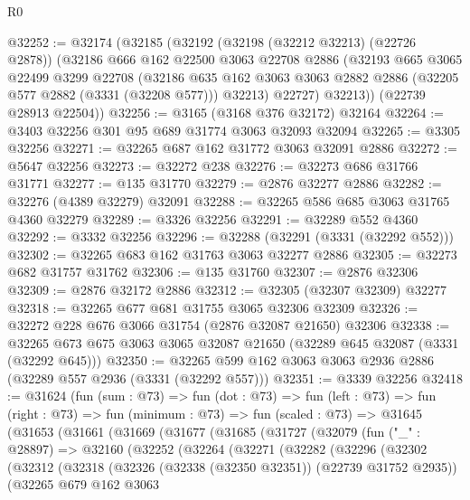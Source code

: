 \begin{lexlean}{R0}
\begin{coremodule}
@32252 := @32174
    (@32185
      (@32192
        (@32198 (@32212 @32213) (@22726 @2878))
        (@32186
          @666
          @162
          @22500
          @3063
          @22708
          @2886
          (@32193
            @665
            @3065
            @22499
            @3299
            @22708
            (@32186
              @635
              @162
              @3063
              @3063
              @2882
              @2886
              (@32205 @577 @2882 (@3331 (@32208 @577)))
              @32213)
            @22727)
          @32213))
      (@22739 @28913 @22504))
@32256 := @3165 (@3168 @376 @32172) @32164
@32264 := @3403 @32256 @301 @95 @689 @31774 @3063 @32093 @32094
@32265 := @3305 @32256
@32271 := @32265 @687 @162 @31772 @3063 @32091 @2886
@32272 := @5647 @32256
@32273 := @32272 @238
@32276 := @32273 @686 @31766 @31771
@32277 := @135 @31770
@32279 := @2876 @32277 @2886
@32282 := @32276 (@4389 @32279) @32091
@32288 := @32265 @586 @685 @3063 @31765 @4360 @32279
@32289 := @3326 @32256
@32291 := @32289 @552 @4360
@32292 := @3332 @32256
@32296 := @32288 (@32291 (@3331 (@32292 @552)))
@32302 := @32265 @683 @162 @31763 @3063 @32277 @2886
@32305 := @32273 @682 @31757 @31762
@32306 := @135 @31760
@32307 := @2876 @32306
@32309 := @2876 @32172 @2886
@32312 := @32305 (@32307 @32309) @32277
@32318 := @32265 @677 @681 @31755 @3065 @32306 @32309
@32326 := @32272 @228 @676 @3066 @31754 (@2876 @32087 @21650) @32306
@32338 := @32265 @673 @675 @3063 @3065 @32087 @21650 (@32289 @645 @32087 (@3331 (@32292 @645)))
@32350 := @32265 @599 @162 @3063 @3063 @2936 @2886 (@32289 @557 @2936 (@3331 (@32292 @557)))
@32351 := @3339 @32256
@32418 := @31624
    (fun (sum : @73) =>
    fun (dot : @73) =>
    fun (left : @73) =>
    fun (right : @73) =>
    fun (minimum : @73) =>
    fun (scaled : @73) =>
    @31645
      (@31653
        (@31661
          (@31669
            (@31677
              (@31685
                (@31727
                  (@32079
                    (fun ("_" : @28897) =>
                    @32160
                      (@32252
                        (@32264
                          (@32271
                            (@32282
                              (@32296
                                (@32302
                                  (@32312
                                    (@32318
                                      (@32326 (@32338 (@32350 @32351)) (@22739 @31752 @2935))
                                      (@32265
                                        @679
                                        @162
                                        @3063

\end{coremodule}
\end{lexlean}
